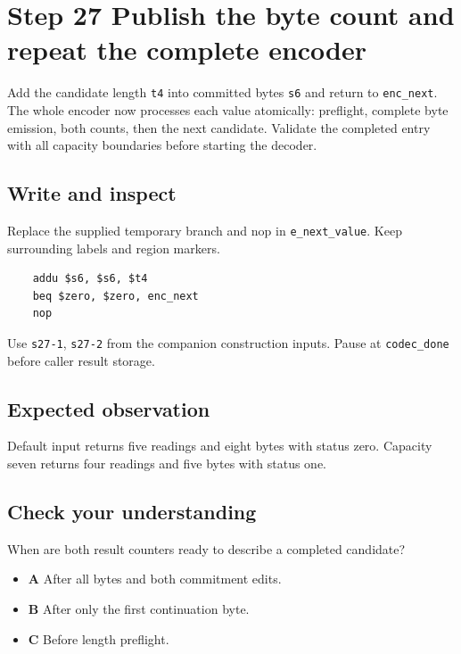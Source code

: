 \section{Step 27 Publish the byte count and repeat the complete encoder}\label{delta-s27}

Add the candidate length \texttt{t4} into committed bytes \texttt{s6} and return to \texttt{enc\_next}. The whole encoder now processes each value atomically: preflight, complete byte emission, both counts, then the next candidate. Validate the completed entry with all capacity boundaries before starting the decoder.

\subsection{Write and inspect}
Replace the supplied temporary branch and nop in \texttt{e\_next\_value}. Keep surrounding labels and region markers.

\begin{verbatim}
    addu $s6, $s6, $t4
    beq $zero, $zero, enc_next
    nop
\end{verbatim}
Use \texttt{s27-1}, \texttt{s27-2} from the companion construction inputs. Pause at \texttt{codec\_done} before caller result storage.

\subsection{Expected observation}
Default input returns five readings and eight bytes with status zero. Capacity seven returns four readings and five bytes with status one.

\subsection{Check your understanding}
When are both result counters ready to describe a completed candidate?

\begin{itemize}
  \item \textbf{A} After all bytes and both commitment edits.
  \item \textbf{B} After only the first continuation byte.
  \item \textbf{C} Before length preflight.
\end{itemize}
